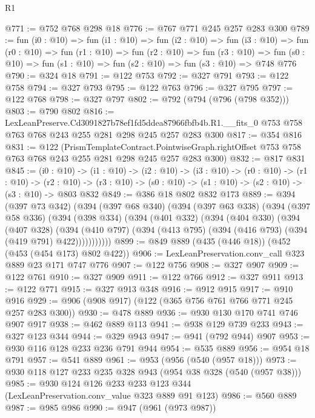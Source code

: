 \begin{lexlean}{R1}
\begin{coremodule}
@771 := @752 @768 @298 @18
@776 := @767 @771 @245 @257 @283 @300
@789 := fun (i0 : @10) =>
  fun (i1 : @10) =>
  fun (i2 : @10) =>
  fun (i3 : @10) =>
  fun (r0 : @10) =>
  fun (r1 : @10) =>
  fun (r2 : @10) =>
  fun (r3 : @10) =>
  fun (s0 : @10) => fun (s1 : @10) => fun (s2 : @10) => fun (s3 : @10) => @748 @776
@790 := @324 @18
@791 := @122 @753
@792 := @327 @791
@793 := @122 @758
@794 := @327 @793
@795 := @122 @763
@796 := @327 @795
@797 := @122 @768
@798 := @327 @797
@802 := @792 (@794 (@796 (@798 @352)))
@803 := @790 @802
@816 := LexLeanPreserve.Cd3091827b78ef1fd5ddea87966fbfb4b.R1.__fits_0
    @753
    @758
    @763
    @768
    @243
    @255
    @281
    @298
    @245
    @257
    @283
    @300
@817 := @354 @816
@831 := @122
    (PrismTemplateContract.PointwiseGraph.rightOffset
      @753
      @758
      @763
      @768
      @243
      @255
      @281
      @298
      @245
      @257
      @283
      @300)
@832 := @817 @831
@845 := (i0 : @10) ->
  (i1 : @10) ->
  (i2 : @10) ->
  (i3 : @10) ->
  (r0 : @10) ->
  (r1 : @10) ->
  (r2 : @10) -> (r3 : @10) -> (s0 : @10) -> (s1 : @10) -> (s2 : @10) -> (s3 : @10) -> @803 @832
@849 := @386 @18 @802 @832 @173
@889 := @394
    (@397 @73 @342)
    (@394
      (@397 @68 @340)
      (@394
        (@397 @63 @338)
        (@394
          (@397 @58 @336)
          (@394
            (@398 @334)
            (@394
              (@401 @332)
              (@394
                (@404 @330)
                (@394
                  (@407 @328)
                  (@394
                    (@410 @797)
                    (@394 (@413 @795) (@394 (@416 @793) (@394 (@419 @791) @422)))))))))))
@899 := @849 @889 (@435 (@446 @18)) (@452 (@453 (@454 @173) @802 @422))
@906 := LexLeanPreservation.conv_call @323 @889 @23 @171 @747 @776
@907 := @122 @756
@908 := @327 @907
@909 := @122 @761
@910 := @327 @909
@911 := @122 @766
@912 := @327 @911
@913 := @122 @771
@915 := @327 @913 @348
@916 := @912 @915
@917 := @910 @916
@929 := @906 (@908 @917) (@122 (@365 @756 @761 @766 @771 @245 @257 @283 @300))
@930 := @478 @889
@936 := @930 @130 @170 @741 @746 @907 @917
@938 := @462 @889 @113
@941 := @938 @129 @739 @233
@943 := @327 @123 @344
@944 := @329 @943
@947 := @941 (@792 @944) @907
@953 := @930 @116 @128 @233 @236 @791 @944
@954 := @535 @889
@956 := @954 @18 @791
@957 := @541 @889
@961 := @953 (@956 (@540 (@957 @18)))
@973 := @930 @118 @127 @233 @235 @328 @943 (@954 @38 @328 (@540 (@957 @38)))
@985 := @930 @124 @126 @233 @233 @123 @344 (LexLeanPreservation.conv_value @323 @889 @91 @123)
@986 := @560 @889
@987 := @985 @986
@990 := @947 (@961 (@973 @987))

\end{coremodule}
\end{lexlean}
